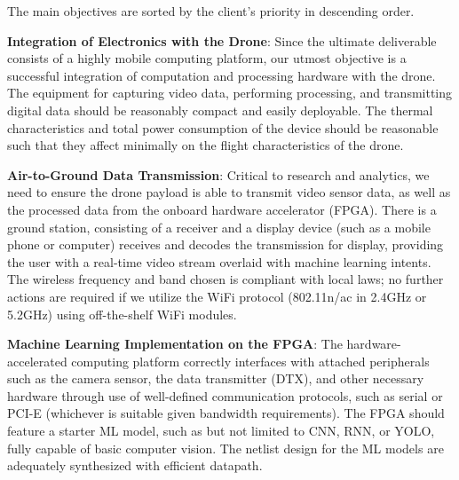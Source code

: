 The main objectives are sorted by the client's priority in descending order.

\textbf{Integration of Electronics with the Drone}:
Since the ultimate deliverable consists of a highly mobile computing platform,
our utmost objective is a successful integration of computation and processing hardware with the drone.
The equipment for capturing video data, performing processing, and transmitting digital data should be reasonably compact and easily deployable.
The thermal characteristics and total power consumption of the device should be reasonable such that they affect minimally
on the flight characteristics of the drone.

\textbf{Air-to-Ground Data Transmission}:
Critical to research and analytics, we need to ensure the drone payload is able to transmit video sensor data, as well as the processed data
from the onboard hardware accelerator (FPGA). There is a ground station, consisting of a receiver and a display device (such as a mobile phone or 
computer) receives and decodes the transmission for display, providing the user with a real-time video stream overlaid with machine learning intents.
The wireless frequency and band chosen is compliant with local laws; no further actions are required if we utilize the WiFi protocol (802.11n/ac in 2.4GHz or 5.2GHz)
using off-the-shelf WiFi modules.

\textbf{Machine Learning Implementation on the FPGA}:
The hardware-accelerated computing platform correctly interfaces with attached peripherals such as the camera sensor, the data transmitter (DTX), and other necessary hardware
through use of well-defined communication protocols, such as serial or PCI-E (whichever is suitable given bandwidth requirements). 
The FPGA should feature a starter ML model, such as but not limited to CNN, RNN, or YOLO, fully capable of basic computer vision.
The netlist design for the ML models are adequately synthesized with efficient datapath.
